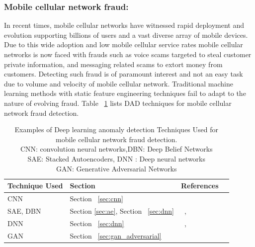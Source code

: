 \subsubsection{Mobile cellular network fraud:}
In recent times, mobile cellular networks  have witnessed  rapid deployment and evolution
supporting billions of users and a vast diverse array of mobile devices.
Due to this wide adoption and low mobile cellular service rates mobile
cellular networks is now faced with frauds such as voice scams targeted to steal customer private information, and messaging related scams to extort money from customers. Detecting such fraud is of paramount interest and not an easy task due to volume and velocity of mobile cellular network.
Traditional machine learning methods with static feature engineering  techniques fail to adapt to the nature of evolving fraud.
Table ~\ref{tab:mobilefraudDetect} lists DAD techniques for mobile cellular network fraud detection.

\begin{table}
\begin{center}
  \caption{Examples of Deep learning anomaly detection Techniques Used for mobile cellular network fraud detection.
          \\CNN:  convolution neural networks,DBN: Deep Belief Networks
          \\SAE: Stacked Autoencoders, DNN : Deep neural networks
          \\GAN: Generative Adversarial Networks }
  \label{tab:mobilefraudDetect}
    \begin{tabular}{ | l | p{2cm} | l | p{5cm} |}
    \hline
    Technique Used & Section & References \\ \hline
     CNN    & Section ~\ref{sec:cnn}  & ~\cite{chouiekh2018convnets} \\\hline
     SAE, DBN    & Section \ref{sec:ae}, Section ~\ref{sec:dnn}   &  ~\cite{alsheikh2016mobile},~\cite{badhe2017click} \\\hline
     DNN & Section ~\ref{sec:dnn}  &  ~\cite{akhter2012detecting},~\cite{jain2017perspective} \\\hline
     GAN & Section ~\ref{sec:gan_adversarial} &  ~\cite{zheng2018generative} \\\hline
    \end{tabular}
\end{center}
\end{table}

